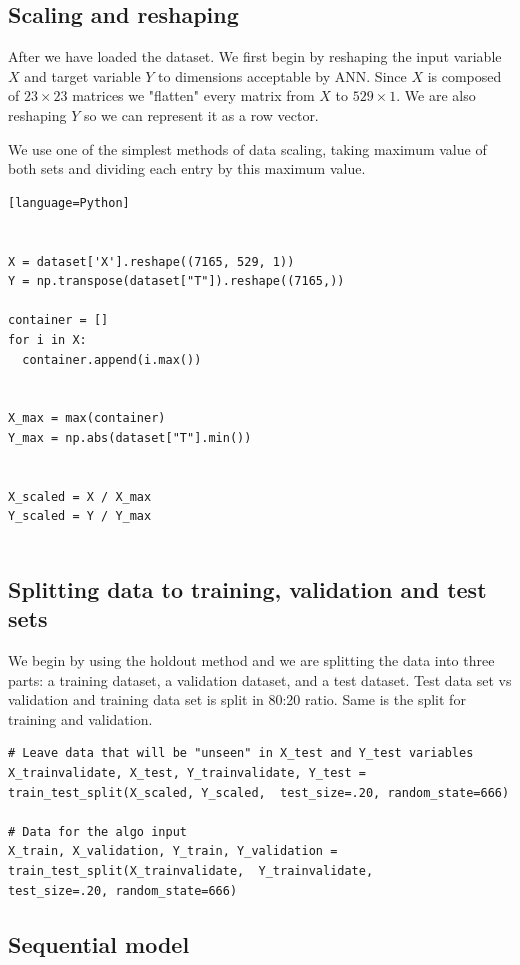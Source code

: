 \documentclass[a4paper,oneside,openright,11pt]{book}
\begin{document}
\subsection{Scaling and reshaping}

After we have loaded the dataset. We first begin by reshaping the input variable $X$ and target variable $Y$ to dimensions acceptable by ANN. Since $X$ is composed of  $23 \times 23$ matrices we "flatten" every matrix from $X$ to $529 \times 1$. We are also reshaping $Y$ so we can represent it as a row vector.

We use one of the simplest methods of data scaling, taking maximum value of both sets and dividing each entry by this maximum value.

\begin{verbatim}[language=Python]


X = dataset['X'].reshape((7165, 529, 1)) 
Y = np.transpose(dataset["T"]).reshape((7165,))

container = []
for i in X:
  container.append(i.max())
  

X_max = max(container)
Y_max = np.abs(dataset["T"].min())


X_scaled = X / X_max
Y_scaled = Y / Y_max


\end{verbatim}

\subsection{Splitting data to training, validation and test sets}

We begin by using the holdout method and we are splitting the data into three parts: a training dataset, a validation dataset, and a test dataset. Test data set vs validation and training data set is split in 80:20 ratio. Same is the split for training and validation.


\begin{lstlisting}
# Leave data that will be "unseen" in X_test and Y_test variables
X_trainvalidate, X_test, Y_trainvalidate, Y_test = train_test_split(X_scaled, Y_scaled,  test_size=.20, random_state=666)

# Data for the algo input
X_train, X_validation, Y_train, Y_validation = train_test_split(X_trainvalidate,  Y_trainvalidate,  
test_size=.20, random_state=666)
\end{lstlisting}


\subsection{Sequential model}
\end{document}
